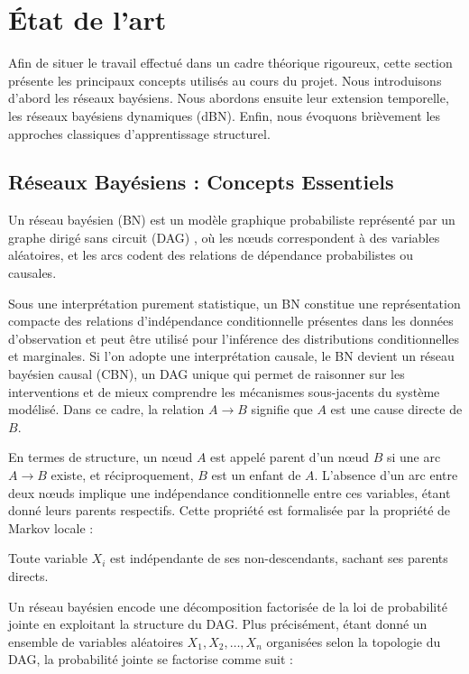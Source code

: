 \documentclass{article}
\begin{document}
\section{État de l'art}

Afin de situer le travail effectué dans un cadre théorique rigoureux, cette section présente les principaux concepts
utilisés au cours du projet. Nous introduisons d'abord les réseaux bayésiens. Nous abordons ensuite leur extension
temporelle, les réseaux bayésiens dynamiques (dBN). Enfin, nous évoquons brièvement les approches classiques
d'apprentissage structurel.

\subsection{Réseaux Bayésiens : Concepts Essentiels}


Un réseau bayésien (BN) est un modèle graphique probabiliste représenté par un graphe dirigé sans circuit
(DAG) \cite{mihajlovic2001dynamic}, où les nœuds correspondent à des variables aléatoires, et les arcs codent
des relations de dépendance probabilistes ou causales.

Sous une interprétation purement statistique, un BN constitue une représentation compacte des relations
d'indépendance conditionnelle présentes dans les données d'observation et peut être utilisé pour l'inférence des
distributions conditionnelles et marginales. Si l'on adopte une interprétation causale, le BN devient un réseau
bayésien causal (CBN), un DAG unique qui permet de raisonner sur les interventions et de mieux comprendre les
mécanismes sous-jacents du système modélisé. Dans ce cadre, la relation $A \to B$ signifie que $A$ est une cause
directe de $B$.

En termes de structure, un nœud $A$ est appelé parent d'un nœud $B$ si une arc $A \to B$ existe, et réciproquement,
$B$ est un enfant de $A$. L'absence d'un arc entre deux nœuds implique une indépendance conditionnelle entre ces
variables, étant donné leurs parents respectifs. Cette propriété est formalisée par la propriété de Markov locale :

\begin{center}
    Toute variable $X_i$ est indépendante de ses non-descendants, sachant ses parents directs.
\end{center}

Un réseau bayésien encode une décomposition factorisée de la loi de probabilité jointe en exploitant la structure
du DAG. Plus précisément, étant donné un ensemble de variables aléatoires $X_1, X_2, \dots, X_n$ organisées selon
la topologie du DAG, la probabilité jointe se factorise comme suit :
\end{document}
